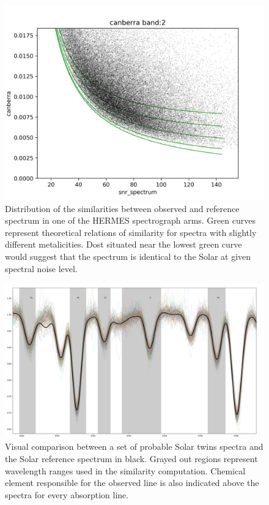 \begin{figure}
	\centering
	\includegraphics[width=\columnwidth]{canberra_b2_g-all.png}
	\caption{Distribution of the similarities between observed and reference spectrum in one of the HERMES spectrograph arms. Green curves represent theoretical relations of similarity for spectra with slightly different metalicities. Dost situated near the lowest green curve would suggest that the spectrum is identical to the Solar at given spectral noise level.}
	\label{fig:similarity_b2}
\end{figure}

\begin{figure}
	\centering
	\includegraphics[width=\columnwidth]{selection_step1.png}
	\caption{Visual comparison between a set of probable Solar twins spectra and the Solar reference spectrum in black. Grayed out regions represent wavelength ranges used in the similarity computation. Chemical element responsible for the observed line is also indicated above the spectra for every absorption line.}
	\label{fig:selection_step1}
\end{figure}

